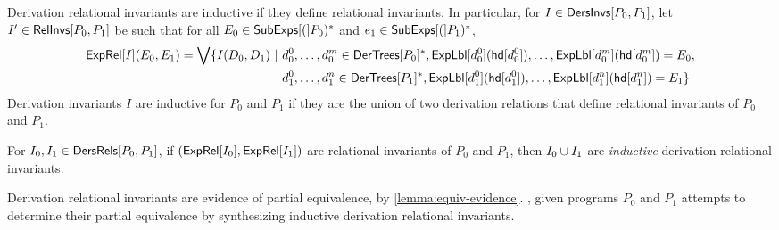 Derivation relational invariants are inductive if they define
relational invariants.
%
In particular, for $I \in \mathsf{DersInvs}[ P_0, P_1 ]$, let $I' \in
\mathsf{RelInvs}[ P_0, P_1 ]$ be such that for all $E_0 \in \mathsf{SubExps}[ ( ]P_0)^{*}$
and $e_1 \in \mathsf{SubExps}[ ( ]P_1)^{*}$,
\begin{align*}
  \exprel{I}(E_0, E_1) = %
  \biglor \setformer{ I(D_0, D_1)}{ %
    & d_0^0, \ldots, d_0^m \in \dertrees{P_0}^{*}, %
    \explabel{d_0^0}(\head{d_0^0}), \ldots,
    \explabel{d_0^m}(\head{d_0^m}) = E_0, \\
    & d_1^0, \ldots, d_1^n \in \dertrees{P_1}^{*},  %
    \explabel{d_1^0}(\head{d_1^0}), \ldots,
    \explabel{d_1^n}(\head{d_1^n}) = E_1 }
\end{align*}
%
Derivation invariants $I$ are inductive for $P_0$ and $P_1$ if they
are the union of two derivation relations that define relational
invariants of $P_0$ and $P_1$.
%
\begin{defn}
  \label{defn:inductive-der-rels}
  For $I_0, I_1 \in \mathsf{DersRels}[ P_0, P_1 ]$, if $(\mathsf{ExpRel}[ I_0 ],
  \mathsf{ExpRel}[ I_1 ])$ are relational invariants of $P_0$ and $P_1$, then
  $I_0 \cup I_1$ are \emph{inductive} derivation relational
  invariants.
\end{defn}
%
Derivation relational invariants are evidence of partial equivalence,
by \autoref{lemma:equiv-evidence}.
%
\sys, given programs $P_0$ and $P_1$ attempts to determine their
partial equivalence by synthesizing inductive derivation relational
invariants.

